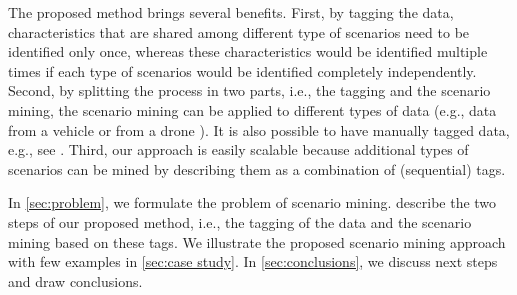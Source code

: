 \cstarta The proposed method brings several benefits. 
First, by tagging the data, characteristics that are shared among different type of scenarios need to be identified only once, whereas these characteristics would be identified multiple times if each type of scenarios would be identified completely independently.
Second, by splitting the process in two parts, i.e., the tagging and the scenario mining, the scenario mining can be applied to different types of data (e.g., data from a vehicle \autocite{paardekooper2019dataset6000km} or from a drone \autocite{krajewski2018highD}). 
It is also possible to have manually tagged data, e.g., see \autocite{fontana2018action}. 
Third, our approach is easily scalable because additional types of scenarios can be mined by  describing them as a combination of (sequential) tags.

In \cref{sec:problem}, we formulate the problem of scenario mining.  describe the two steps of our proposed method, i.e., the tagging of the data and the scenario mining based on these tags. 
We illustrate the proposed scenario mining approach with few examples in \cref{sec:case study}. 
In \cref{sec:conclusions}, we discuss next steps and draw conclusions.

\cenda
